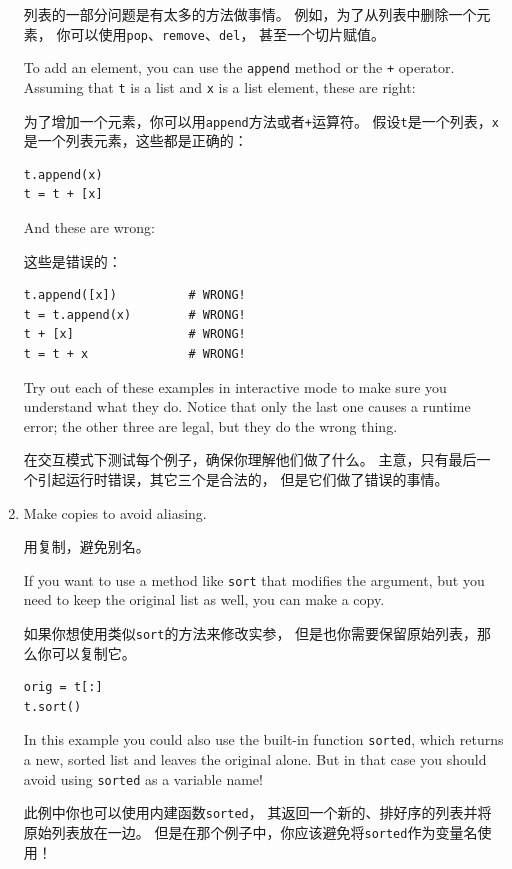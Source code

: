 \documentclass[10pt]{book}
\begin{document}
\begin{CJK}{UTF8}{gbsn}
\begin{enumerate}
列表的一部分问题是有太多的方法做事情。
例如，为了从列表中删除一个元素，
你可以使用{\tt pop}、{\tt remove}、{\tt del}，
甚至一个切片赋值。

To add an element, you can use the {\tt append} method or
the {\tt +} operator.  Assuming that {\tt t} is a list and
{\tt x} is a list element, these are right: 

为了增加一个元素，你可以用{\tt append}方法或者{\tt +}运算符。
假设{\tt t}是一个列表，{\tt x}是一个列表元素，这些都是正确的：

\begin{verbatim}
t.append(x)
t = t + [x]
\end{verbatim}

And these are wrong:

这些是错误的：

\begin{verbatim}
t.append([x])          # WRONG!
t = t.append(x)        # WRONG!
t + [x]                # WRONG!
t = t + x              # WRONG!
\end{verbatim}

Try out each of these examples in interactive mode to make sure
you understand what they do.  Notice that only the last
one causes a runtime error; the other three are legal, but they
do the wrong thing.

在交互模式下测试每个例子，确保你理解他们做了什么。
主意，只有最后一个引起运行时错误，其它三个是合法的，
但是它们做了错误的事情。


\item Make copies to avoid aliasing.

用复制，避免别名。

If you want to use a method like {\tt sort} that modifies
the argument, but you need to keep the original list as
well, you can make a copy.

如果你想使用类似{\tt sort}的方法来修改实参，
但是也你需要保留原始列表，那么你可以复制它。

\begin{verbatim}
orig = t[:]
t.sort()
\end{verbatim}

In this example you could also use the built-in function {\tt sorted},
which returns a new, sorted list and leaves the original alone.
But in that case you should avoid using {\tt sorted} as a variable
name!

此例中你也可以使用内建函数{\tt sorted}，
其返回一个新的、排好序的列表并将原始列表放在一边。
但是在那个例子中，你应该避免将{\tt sorted}作为变量名使用！


\end{enumerate}
\end{CJK}
\end{document}
